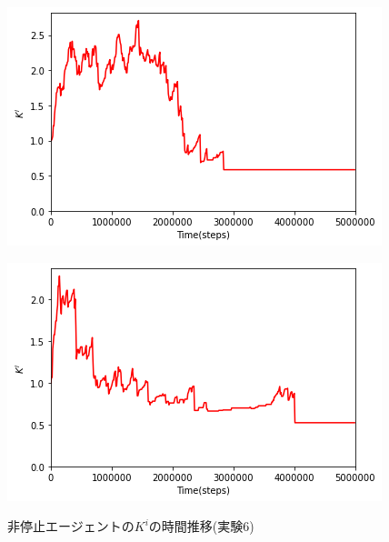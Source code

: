\documentclass[12pt,a4j,twoside]{jarticle}
\begin{document}
\begin{figure}
\begin{minipage}{0.48\hsize}
      \includegraphics[width=0.99\hsize]{figures/CorrectionTransition_TimeStop_2.png}
      \label{subfig:transition_time_2}
    \end{minipage}
    \hfill
    \begin{minipage}{0.48\hsize}
      \centering
      \includegraphics[width=0.99\hsize]{figures/CorrectionTransition_TimeStop_16.png}
      \label{subfig:transition_time_16}
    \end{minipage}
    \caption{非停止エージェントの$K^i$の時間推移(実験6)}
    \label{fig:transition_notSuspend_time}
  \end{figure}
\end{document}
